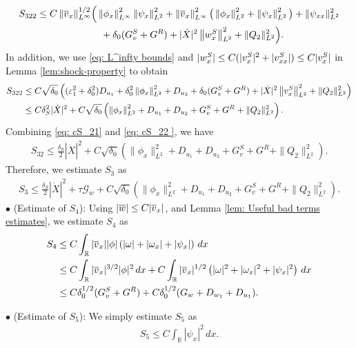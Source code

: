 \documentclass[11pt,reqno]{amsart}
\begin{document}
\begin{appendix}
\begin{align*}
S_{322} \le C \left\lVert\overline{v}_x\right\rVert_{L^\infty}^{1/2} &\Big( \left\lVert\phi_x\right\rVert_{L^\infty}^2 \left\lVert\psi_x\right\rVert_{L^2}^2+ \left\lVert\overline{v}_x\right\rVert_{L^\infty}^2 \big(\left\lVert\phi_x\right\rVert_{L^2}^2 + \left\lVert\psi_x\right\rVert_{L^2}^2 \big)  +\|\psi_{xx}\|_{L^2}^2\\ 
& \quad +\delta_0 ( G^S_v+G^R) + |\dot{X}|^2 \left\lVert w^S_x\right\rVert_{L^2}^2 +\|Q_2\|_{L^2}^2 \Big).
\end{align*}
In addition, we use \eqref{eq: L^infty bounds} and $|w^S_x| \le C (|v^S_x|^2 +|v^S_{xx}|)\le C |v^S_x|$ in Lemma \ref{lem:shock-property} to obtain 
\begin{equation} \label{eq: cS_22 }
\begin{aligned}
S_{322}
& \le C \sqrt{\delta_0} \left( ( \varepsilon_1^2 +\delta_0^2) D_{u_1}+ \delta_0^2  \left\lVert\phi_x\right\rVert_{L^2}^2 +D_{u_2} + \delta_0 (G^S_v+G^R)+  | \dot{X}|^2 \left\lVert v^S_x\right\rVert_{L^2}^2+\|Q_2\|_{L^2}^2 \right)\\ 
&\le  C \delta_S^2 |\dot{X}|^2 + C \sqrt{\delta_0} \left(\left\lVert\phi_x\right\rVert_{L^2}^2+ D_{u_1} +D_{u_2} +G^S_v+G^R +\|Q_2\|_{L^2}^2 \right).
\end{aligned}
\end{equation}
Combining \eqref{eq: cS_21} and \eqref{eq: cS_22 }, we have
\begin{align*}
S_{32} \le \frac{\delta_S}{2} |\dot{X}|^2 + C \sqrt{\delta_0} \left( \|\phi_x\|_{L^2}^2 + D_{u_1}+D_{u_2} +G^S_v+G^R  +\|Q_2\|_{L^2}^2 \right).
\end{align*}
Therefore, we estimate $S_{3}$ as
\begin{align*}
S_{3} \le \frac{\delta_S}{2} |\dot{X}|^2 + \tau \mathcal{G}_w + C \sqrt{\delta_0} \left( \|\phi_x\|_{L^2}^2 + D_{u_1}+D_{u_2} +G^S_v+G^R   +\|Q_2\|_{L^2}^2\right).
\end{align*}
\noindent $\bullet$ (Estimate of $S_4$): Using $|\overline{w}| \le C |\overline{v}_x| $, and Lemma \ref{lem: Useful bad terms estimates}, we estimate $S_4$ as
\begin{align*}
S_4 &\le C \int_\mathbb{R} |\overline{v}_x| |\phi| \left( |\omega|+ |\omega_x| + |\psi_x| \right) \, dx \\ 
&\le  C \int_\mathbb{R} |\overline{v}_x|^{3/2} |\phi|^2 \, dx + C \int_\mathbb{R} |\overline{v}_x|^{1/2} \left( |\omega|^2+ |\omega_x|^2 + |\psi_x|^2 \right)\, dx \\ 
&\le C \delta_0^{1/2} (G^S_v + G^R) +C \delta_0^{1/2} (G_w + D_{w_1} + D_{u_1}).
\end{align*}

\noindent $\bullet$ (Estimate of $S_{5}$): We simply estimate $S_{5}$ as
\begin{align*}
S_{5} \le C \int_\mathbb{R} |\psi_x|^2 \, dx.
\end{align*}


\end{appendix}
\end{document}
